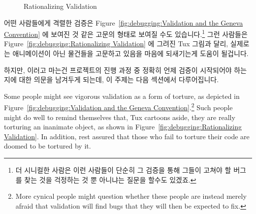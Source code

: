 \begin{figure}[tb]
\centering
{}
\caption{Rationalizing Validation}
\end{figure}

어떤 사람들에게 격렬한 검증은
Figure~\ref{fig:debugging:Validation and the Geneva Convention} 에 보여진 것
같은 고문의 형태로 보여질 수도 있습니다.\footnote{
	더 시니컬한 사람은 이런 사람들이 단순히 그 검증을 통해 그들이 고쳐야 할
	버그를 찾는 것을 걱정하는 것 뿐 아니냐는 질문을 할수도 있겠죠.}
그런 사람들은
Figure~\ref{fig:debugging:Rationalizing Validation} 에 그려진 Tux 그림과 달리,
실제로는 애니메이션이 아닌 물건들을 고문하고 있음을 마음에 되새기는게 도움이
될겁니다.

하지만, 이러고 마는건 프로젝트의 진행 과정 중 정확히 언제 검증이 시작되어야
하는지에 대한 의문을 남겨두게 되는데, 이 주제는 다음 섹션에서 다루어집니다.
\iffalse

Some people might see vigorous validation as a form of torture, as
depicted in
Figure~\ref{fig:debugging:Validation and the Geneva Convention}.\footnote{
	More cynical people might question whether these people are instead
	merely afraid that validation will find bugs that they will then
	be expected to fix.}
Such people might do well to remind themselves that, Tux cartoons aside,
they are really torturing an inanimate object, as shown in
Figure~\ref{fig:debugging:Rationalizing Validation}.
In addition, rest assured that those who fail to torture their code are
doomed to be tortured by it.

